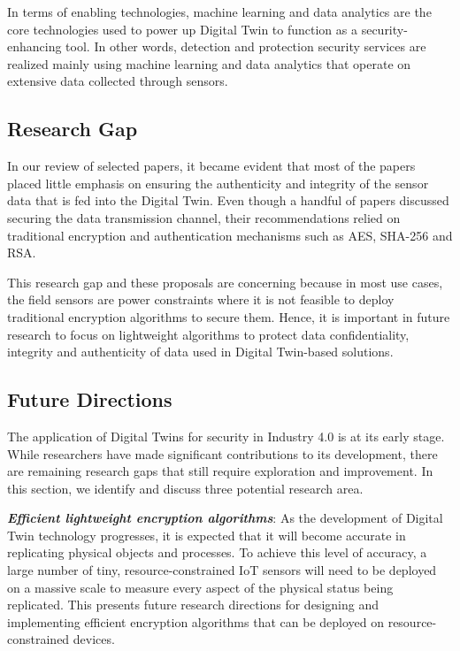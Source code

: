 In terms of enabling technologies, machine learning and data analytics are the core technologies used to power up Digital Twin to function as a security-enhancing tool. In other words, detection and protection security services are realized mainly using machine learning and data analytics that operate on extensive data collected through sensors. 


\subsection{Research Gap}
\label{sec:gap}

In our review of selected papers, it became evident that most of the papers placed little emphasis on ensuring the authenticity and integrity of the sensor data that is fed into the Digital Twin. Even though a handful of papers discussed securing the data transmission channel, their recommendations relied on traditional encryption and authentication mechanisms such as AES, SHA-256 and RSA. 

This research gap and these proposals are concerning because in most use cases, the field sensors are power constraints where it is not feasible to deploy traditional encryption algorithms to secure them. Hence, it is important in future research to focus on lightweight algorithms to protect data confidentiality, integrity and authenticity of data used in Digital Twin-based solutions.



\subsection{Future Directions}

The application of Digital Twins for security in Industry 4.0 is at its early stage. While researchers have made significant contributions to its development, there are remaining research gaps that still require exploration and improvement. In this section, we identify and discuss three potential research area.

\textbf{\textit{Efficient lightweight encryption algorithms}}: As the development of Digital Twin technology progresses, it is expected that it will become accurate in replicating physical objects and processes. To achieve this level of accuracy, a large number of tiny, resource-constrained IoT sensors will need to be deployed on a massive scale to measure every aspect of the physical status being replicated. This presents future research directions for designing and implementing efficient encryption algorithms that can be deployed on resource-constrained devices.


